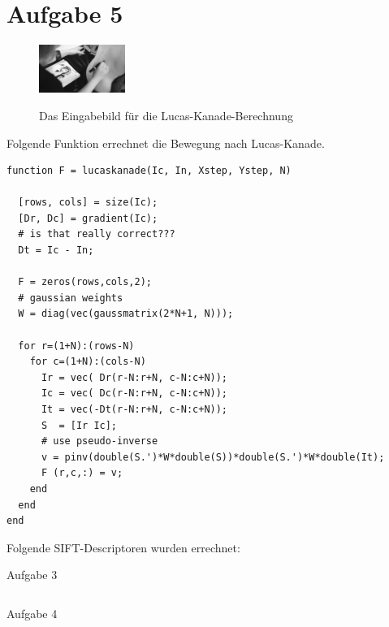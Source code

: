 




\newcommand{\nr}{3}


\section*{Aufgabe 5}

\begin{figure}[htpb]
\begin{center}
{\includegraphics[width=0.25\textwidth]{samples/mrs.easy/101.png}}
\end{center}
\caption{Das Eingabebild für die Lucas-Kanade-Berechnung }
\label{fig:u03-picture}
\end{figure}

Folgende Funktion errechnet die Bewegung nach Lucas-Kanade.

\lstset{language=matlab}
\begin{lstlisting}[caption={Berechnung des SIFT-Descriptor-Vektors}]
function F = lucaskanade(Ic, In, Xstep, Ystep, N)

  [rows, cols] = size(Ic);
  [Dr, Dc] = gradient(Ic);
  # is that really correct???
  Dt = Ic - In;

  F = zeros(rows,cols,2);
  # gaussian weights
  W = diag(vec(gaussmatrix(2*N+1, N)));

  for r=(1+N):(rows-N)
    for c=(1+N):(cols-N)
      Ir = vec( Dr(r-N:r+N, c-N:c+N));
      Ic = vec( Dc(r-N:r+N, c-N:c+N));
      It = vec(-Dt(r-N:r+N, c-N:c+N));
      S  = [Ir Ic];
      # use pseudo-inverse
      v = pinv(double(S.')*W*double(S))*double(S.')*W*double(It);
      F (r,c,:) = v;
    end
  end
end
\end{lstlisting}



Folgende SIFT-Descriptoren wurden errechnet:

Aufgabe 3
\lstset{language=matlab}
\begin{lstlisting}[caption={Berechnung des SIFT-Descriptor-Vektors}]

\end{lstlisting}

Aufgabe 4
\lstset{language=matlab}
\begin{lstlisting}[caption={Berechnung des SIFT-Descriptor-Vektors}]

\end{lstlisting}


